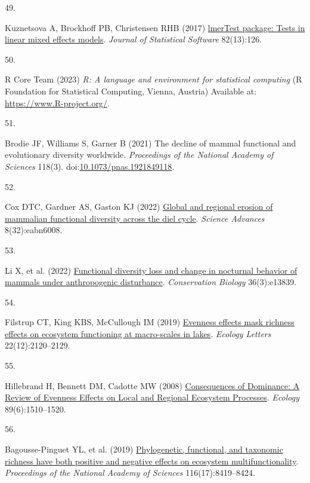\documentclass{article}
\newlength{\cslhangindent}
\newlength{\csllabelwidth}
\newlength{\cslentryspacingunit} %
\newenvironment{CSLReferences}[2] %
 {%
  \setlength{\parindent}{0pt}
  \ifodd #1
  \let\oldpar\par
  \def\par{\hangindent=\cslhangindent\oldpar}
  \fi
  \setlength{\parskip}{#2\cslentryspacingunit}
 }%
 {}
\newcommand{\CSLLeftMargin}[1]{\parbox[t]{\csllabelwidth}{#1}}
\newcommand{\CSLRightInline}[1]{\parbox[t]{\linewidth - \csllabelwidth}{#1}\break}
\begin{document}
\begin{CSLReferences}{0}{0}
\leavevmode{}%
\CSLLeftMargin{49. }%
\CSLRightInline{Kuznetsova A, Brockhoff PB, Christensen RHB (2017)
\href{https://doi.org/10.18637/jss.v082.i13}{lmerTest package: Tests in
linear mixed effects models}. \emph{Journal of Statistical Software}
82(13):126.}

\leavevmode{}%
\CSLLeftMargin{50. }%
\CSLRightInline{R Core Team (2023) \emph{R: A language and environment
for statistical computing} (R Foundation for Statistical Computing,
Vienna, Austria) Available at: \url{https://www.R-project.org/}.}

\leavevmode{}%
\CSLLeftMargin{51. }%
\CSLRightInline{Brodie JF, Williams S, Garner B (2021) The decline of
mammal functional and evolutionary diversity worldwide.
\emph{Proceedings of the National Academy of Sciences} 118(3).
doi:\href{https://doi.org/10.1073/pnas.1921849118}{10.1073/pnas.1921849118}.}

\leavevmode{}%
\CSLLeftMargin{52. }%
\CSLRightInline{Cox DTC, Gardner AS, Gaston KJ (2022)
\href{https://doi.org/10.1126/sciadv.abn6008}{Global and regional
erosion of mammalian functional diversity across the diel cycle}.
\emph{Science Advances} 8(32):eabn6008.}

\leavevmode{}%
\CSLLeftMargin{53. }%
\CSLRightInline{Li X, et al. (2022)
\href{https://doi.org/10.1111/cobi.13839}{Functional diversity loss and
change in nocturnal behavior of mammals under anthropogenic
disturbance}. \emph{Conservation Biology} 36(3):e13839.}

\leavevmode{}%
\CSLLeftMargin{54. }%
\CSLRightInline{Filstrup CT, King KBS, McCullough IM (2019)
\href{https://doi.org/10.1111/ele.13407}{Evenness effects mask richness
effects on ecosystem functioning at macro-scales in lakes}.
\emph{Ecology Letters} 22(12):2120--2129.}

\leavevmode{}%
\CSLLeftMargin{55. }%
\CSLRightInline{Hillebrand H, Bennett DM, Cadotte MW (2008)
\href{https://doi.org/10.1890/07-1053.1}{Consequences of Dominance: A
Review of Evenness Effects on Local and Regional Ecosystem Processes}.
\emph{Ecology} 89(6):1510--1520.}

\leavevmode{}%
\CSLLeftMargin{56. }%
\CSLRightInline{Bagousse-Pinguet YL, et al. (2019)
\href{https://doi.org/10.1073/pnas.1815727116}{Phylogenetic, functional,
and taxonomic richness have both positive and negative effects on
ecosystem multifunctionality}. \emph{Proceedings of the National Academy
of Sciences} 116(17):8419--8424.}


\end{CSLReferences}
\end{document}
